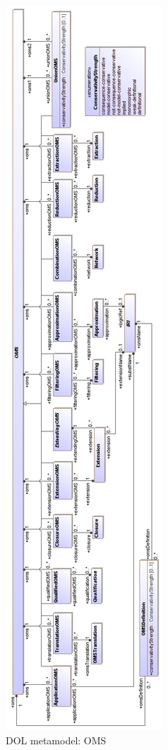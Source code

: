 \documentclass[10pt,fleqn,final]{scrreprt}
\newenvironment{definitions}[0]{\medskip }{}
\begin{document}
\begin{definitions}
\newpage
\voffset -2cm
\begin{figure}
  \centering
    \includegraphics[scale=0.47]{mof/oms.png}
  \caption{DOL metamodel: OMS}
  \label{fig:oms}
\end{figure}


\end{definitions}
\end{document}
